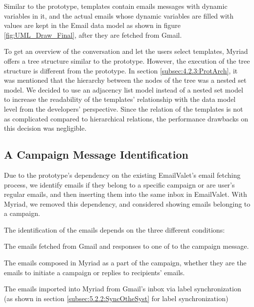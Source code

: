 Similar to the prototype, templates contain emails messages with dynamic variables in it, and the actual emails whose dynamic variables are filled with values are kept in the Email data model as shown in figure \ref{fig:UML_Draw_Final}, after they are fetched from Gmail.
\vspace{1cm}

To get an overview of the conversation and let the users select templates, Myriad offers a tree structure similar to the prototype. However, the execution of the tree structure is different from the prototype. In section \ref{subsec:4.2.3:ProtArch}, it was mentioned that the hierarchy between the nodes of the tree was a nested set model. We decided to use an adjacency list model instead of a nested set model to increase the readability of the templates' relationship with the data model level from the developers' perspective. Since the relation of the templates is not as complicated compared to hierarchical relations, the performance drawbacks on this decision was negligible.

\subsection{A Campaign Message Identification}
\label{subsec:5.3.3:MessIden}

Due to the prototype's dependency on the existing EmailValet's email fetching process, we identify emails if they belong to a specific campaign or are user's regular emails, and then inserting them into the same inbox in EmailValet. With Myriad, we removed this dependency, and considered showing emails belonging to a campaign.
\vspace{1cm}

The identification of the emails depends on the three different conditions:

\begin{compactenum}
	\item The emails fetched from Gmail and responses to one of to the campaign message.
	\item The emails composed in Myriad as a part of the campaign, whether they are the emails to initiate a campaign or replies to recipients' emails.
	\item The emails imported into Myriad from Gmail's inbox via label synchronization (as shown in section \ref{subsec:5.2.2:SyncOtheSyst} for label synchronization)
\end{compactenum}

